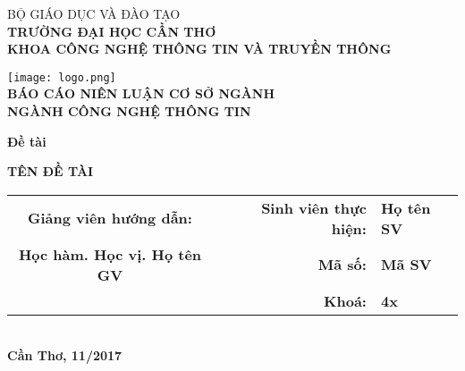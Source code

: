 \documentclass[../thesis.tex]{subfiles}
\begin{document}
\begin{titlepage}

\begin{center}

BỘ GIÁO DỤC VÀ ĐÀO TẠO\\
\textbf{TRƯỜNG ĐẠI HỌC CẦN THƠ\\}
\textbf{KHOA CÔNG NGHỆ THÔNG TIN VÀ TRUYỀN THÔNG\\[1cm]}

\texttt{[image: logo.png]}\\[1cm]

\textbf{BÁO CÁO NIÊN LUẬN CƠ SỞ NGÀNH\\}
\textbf{NGÀNH CÔNG NGHỆ THÔNG TIN\\[2cm]}

\begin{large}
\textbf{Đề tài\\[0.5cm]}
\end{large}
\textbf{{\LARGE TÊN ĐỀ TÀI}}
\\[4cm]

\begin{tabular}{ c c r l }
 \textbf{Giảng viên hướng dẫn:} & & \textbf{Sinh viên thực hiện:} & \textbf{Họ tên SV}\\ 
 \textbf{Học hàm. Học vị. Họ tên GV} & & \textbf{Mã số:} & \textbf{Mã SV}\\  
 & & \textbf{Khoá:} & \textbf{4x}    
\end{tabular}
\\[4cm]

\textbf{Cần Thơ, 11/2017}

\end{center}

\end{titlepage}
\end{document}
